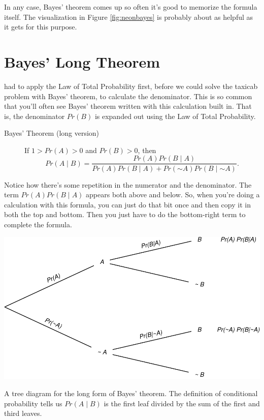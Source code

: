 \documentclass[justified]{tufte-book}
\newcommand{\given}{\mid}
\renewcommand{\neg}{\mathbin{\sim}}
\newcommand{\p}{Pr}
\theoremstyle{definition}
\theoremstyle{definition}
\theoremstyle{definition}
\theoremstyle{remark}
\begin{document}
In any case, Bayes' theorem comes up so often it's good to memorize the formula itself. The visualization in Figure \ref{fig:neonbayes} is probably about as helpful as it gets for this purpose.

\hypertarget{bayes-long-theorem}{%
\section{Bayes' Long Theorem}\label{bayes-long-theorem}}

 had to apply the Law of Total Probability first, before we could solve the taxicab problem with Bayes' theorem, to calculate the denominator. This is so common that you'll often see Bayes' theorem written with this calculation built in. That is, the denominator \(\p(B)\) is expanded out using the Law of Total Probability.

\begin{description}
\item[Bayes' Theorem (long version)]
If \(1 > \p(A) > 0\) and \(\p(B)>0\), then
\[ \p(A \given B) = \frac{\p(A)\p(B \given A)}{\p(A)\p(B \given A) + \p(\neg A)\p(B \given \neg A)}. \]
\end{description}

Notice how there's some repetition in the numerator and the denominator. The term \(\p(A)\p(B \given A)\) appears both above and below. So, when you're doing a calculation with this formula, you can just do that bit once and then copy it in both the top and bottom. Then you just have to do the bottom-right term to complete the formula.

\begin{marginfigure}
\includegraphics{_main_files/figure-latex/longbayestree-1} \caption[A tree diagram for the long form of Bayes' theorem]{A tree diagram for the long form of Bayes' theorem. The definition of conditional probability tells us $\p(A \given B)$ is the first leaf divided by the sum of the first and third leaves.}\label{fig:longbayestree}
\end{marginfigure}
\end{document}
